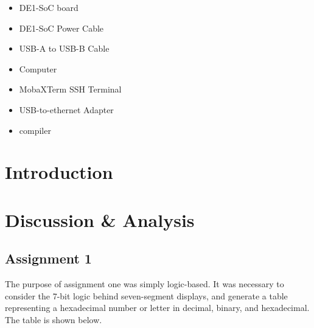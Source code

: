 \documentclass[
	letterpaper, %
	10pt, %
]{CSUniSchoolLabReport}
\begin{document}
\begin{itemize}

  \item DE1-SoC board

  \item DE1-SoC Power Cable

  \item USB-A to USB-B Cable

  \item Computer

  \item MobaXTerm SSH Terminal

  \item USB-to-ethernet Adapter

  \item {} compiler

\end{itemize}

\section{Introduction}

\section{Discussion \& Analysis} 

\subsection{Assignment 1}

The purpose of assignment one was simply logic-based. It was necessary to consider the 7-bit logic behind seven-segment displays, and generate a table representing a hexadecimal number or letter in decimal, binary, and hexadecimal. The table is shown below.
\end{document}
